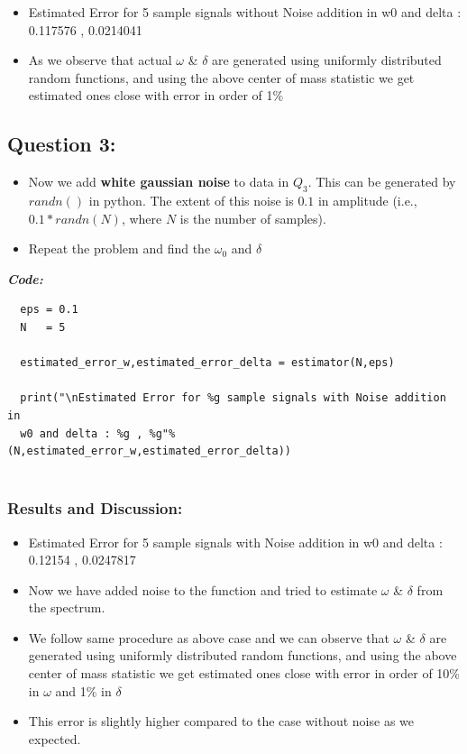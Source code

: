 \documentclass[11pt, a4paper]{article}
\begin{document}
\begin{itemize}
\item


Estimated Error for 5 sample signals without Noise addition in w0 and delta : 0.117576 , 0.0214041

\item
  As we observe that actual \(\omega\) \& \(\delta\) are generated using
  uniformly distributed random functions, and using the above center of
  mass statistic we get estimated ones close with error in order of 1\%
\end{itemize}
		\newpage
\subsection{Question 3:}\label{question-4}

\begin{itemize}

\item
  Now we add \textbf{white gaussian noise} to data in \(Q_3\). This can
  be generated by \(randn()\) in python. The extent of this noise is
  \(0.1\) in amplitude (i.e., \(0.1*randn(N)\), where \(N\) is the
  number of samples).
\item
  Repeat the problem and find the \(\omega_0\) and \(\delta\)
\end{itemize}

\textit{\textbf{Code:}}
\begin{lstlisting}
  eps = 0.1
  N   = 5
  
  estimated_error_w,estimated_error_delta = estimator(N,eps)
  
  print("\nEstimated Error for %g sample signals with Noise addition in 
  w0 and delta : %g , %g"% (N,estimated_error_w,estimated_error_delta))
      
\end{lstlisting}
\subsubsection{Results and Discussion:}\label{results-and-discussion}

\begin{itemize}
\item
Estimated Error for 5 sample signals with Noise addition in w0 and delta : 0.12154 , 0.0247817

\item
  Now we have added noise to the function and tried to estimate \(\omega\) \&
  \(\delta\) from the spectrum.
\item
  We follow same procedure as above case and we can observe that
  \(\omega\) \& \(\delta\) are generated using uniformly distributed
  random functions, and using the above center of mass statistic we get
  estimated ones close with error in order of 10\% in \(\omega\) and 1\%
  in \(\delta\)
\item
  This error is slightly higher compared to the case without noise as we
  expected.
\end{itemize}
\newpage
\end{document}
